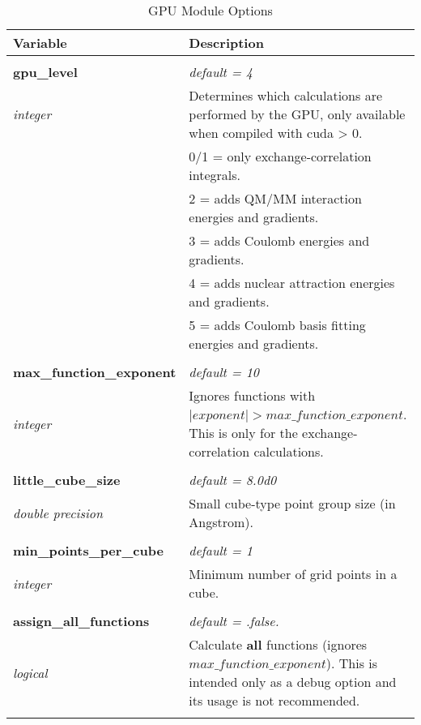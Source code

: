 \begin{Spacing}{1.0}
   \begin{longtable}{ p{} p{} }
   
      \toprule
      \textbf{Variable} & Description \\*
      \midrule \\*
      \endhead
   
      \bottomrule
      \caption{GPU Module Options}
      \endfoot
   
      \textbf{gpu\_level}
      &  \textit{default = 4}
      \\*\textit{integer}
      & Determines which calculations are performed by the GPU, only
      available when compiled with cuda > 0.\\*
      &     0/1 = only exchange-correlation integrals.\\
      &     2 = adds QM/MM interaction energies and gradients.\\
      &     3 = adds Coulomb energies and gradients.\\
      &     4 = adds nuclear attraction energies and gradients.\\
      &     5 = adds Coulomb basis fitting energies and gradients.\\
      \\
   
      \textbf{max\_function\_exponent}
      &  \textit{default = 10}
      \\*\textit{integer}
      & Ignores functions with $\lvert exponent \rvert > 
      max\_function\_exponent$. This is only for the exchange-correlation
      calculations.\\* \\
   
      \textbf{little\_cube\_size}
      &  \textit{default = 8.0d0}
      \\*\textit{double precision}
      & Small cube-type point group size (in Angstrom).\\* \\
   
      \textbf{min\_points\_per\_cube}
      &  \textit{default = 1}
      \\*\textit{integer}
      & Minimum number of grid points in a cube.\\* \\
   
      \textbf{assign\_all\_functions}
      &  \textit{default = .false. }
      \\*\textit{logical}
      & Calculate \textbf{all} functions (ignores $max\_function\_exponent$).
      This is intended only as a debug option and its usage is not recommended.\\* \\
   

\end{longtable}
\end{Spacing}
